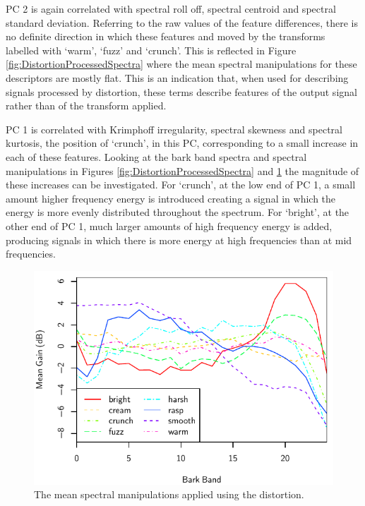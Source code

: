 			PC 2 is again correlated with spectral roll off, spectral centroid and spectral standard deviation.
			Referring to the raw values of the feature differences, there is no definite direction in which
			these features and moved by the transforms labelled with `warm', `fuzz' and `crunch'. This is
			reflected in Figure \ref{fig:DistortionProcessedSpectra} where the mean spectral manipulations for
			these descriptors are mostly flat. This is an indication that, when used for describing signals
			processed by distortion, these terms describe features of the output signal rather than of the
			transform applied.

			PC 1 is correlated with Krimphoff irregularity, spectral skewness and spectral kurtosis, the
			position of `crunch', in this PC, corresponding to a small increase in each of these features.
			Looking at the bark band spectra and spectral manipulations in Figures
			\ref{fig:DistortionProcessedSpectra} and \ref{fig:DistortionDifferenceSpectra} the magnitude of
			these increases can be investigated. For `crunch', at the low end of PC 1, a small amount higher
			frequency energy is introduced creating a signal in which the energy is more evenly distributed
			throughout the spectrum. For `bright', at the other end of PC 1, much larger amounts of high
			frequency energy is added, producing signals in which there is more energy at high frequencies than
			at mid frequencies.

			\begin{figure}[h!]
				\centering
				\includegraphics{chapter4/Images/DistortionDifferenceSpectra.pdf}
				\caption{The mean spectral manipulations applied using the distortion.}
				\label{fig:DistortionDifferenceSpectra}
			\end{figure}

